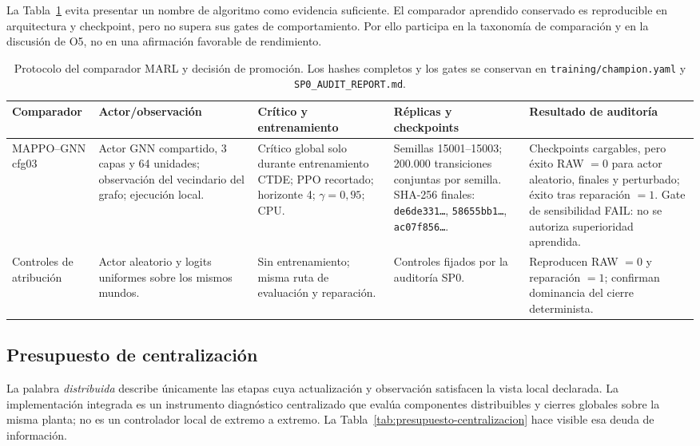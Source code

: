 La Tabla~\ref{tab:protocolo-marl} evita presentar un nombre de algoritmo como evidencia suficiente. El comparador aprendido conservado es reproducible en arquitectura y checkpoint, pero no supera sus gates de comportamiento. Por ello participa en la taxonomía de comparación y en la discusión de O5, no en una afirmación favorable de rendimiento.

\begin{table}[H]
\centering
\scriptsize
\begin{tabularx}{\textwidth}{@{}p{}p{}p{}p{}X@{}}
\toprule
Comparador & Actor/observación & Crítico y entrenamiento & Réplicas y checkpoints & Resultado de auditoría \\
\midrule
MAPPO--GNN cfg03 & Actor GNN compartido, 3 capas y 64 unidades; observación del vecindario del grafo; ejecución local. & Crítico global solo durante entrenamiento CTDE; PPO recortado; horizonte 4; $\gamma=0{,}95$; CPU. & Semillas 15001--15003; 200.000 transiciones conjuntas por semilla. SHA-256 finales: \texttt{de6de331\ldots}, \texttt{58655bb1\ldots}, \texttt{ac07f856\ldots}. & Checkpoints cargables, pero éxito RAW $=0$ para actor aleatorio, finales y perturbado; éxito tras reparación $=1$. Gate de sensibilidad FAIL: no se autoriza superioridad aprendida. \\
Controles de atribución & Actor aleatorio y logits uniformes sobre los mismos mundos. & Sin entrenamiento; misma ruta de evaluación y reparación. & Controles fijados por la auditoría SP0. & Reproducen RAW $=0$ y reparación $=1$; confirman dominancia del cierre determinista. \\
\bottomrule
\end{tabularx}
\caption{Protocolo del comparador MARL y decisión de promoción. Los hashes completos y los gates se conservan en \texttt{training/champion.yaml} y \texttt{SP0\_AUDIT\_REPORT.md}.}
\label{tab:protocolo-marl}
\end{table}

\subsection{Presupuesto de centralización}

La palabra \emph{distribuida} describe únicamente las etapas cuya actualización y observación satisfacen la vista local declarada. La implementación integrada es un instrumento diagnóstico centralizado que evalúa componentes distribuibles y cierres globales sobre la misma planta; no es un controlador local de extremo a extremo. La Tabla~\ref{tab:presupuesto-centralizacion} hace visible esa deuda de información.

